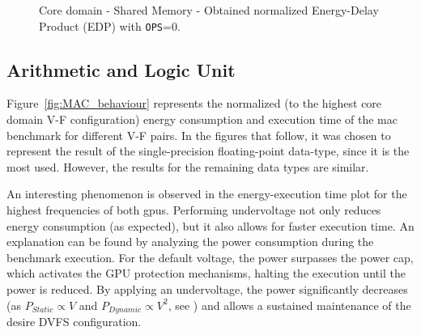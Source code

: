 \begin{figure}[!htb]
    \centering
    \begin{subfigmatrix}{2}
      \label{fig:sm_edp}
    \end{subfigmatrix}
    \caption{Core domain - Shared Memory - Obtained normalized Energy-Delay Product (EDP) with \texttt{OPS}=0.}
\end{figure}



\subsection{Arithmetic and Logic Unit}

\label{sec:MAC_behaviour}
Figure~\ref{fig:MAC_behaviour} represents the normalized (to the highest core domain V-F configuration) energy consumption and execution time of the \acrshort{mac} benchmark for different V-F pairs. In the figures that follow, it was chosen to represent the result of the single-precision floating-point data-type, since it is the most used. However, the results for the remaining data types are similar.

An interesting phenomenon is observed in the energy-execution time plot for the highest frequencies of both \acrshort{gpu}s. Performing undervoltage not only reduces energy consumption (as expected), but it also allows for faster execution time. An explanation can be found by analyzing the power consumption during the benchmark execution. For the default voltage, the power surpasses the power cap, which activates the GPU protection mechanisms, halting the execution until the power is reduced. By applying an undervoltage, the power significantly decreases (as $P_{Static}\propto V$ and $P_{Dynamic}\propto V^2$, see \cite{guerreiro_gpgpu_2018}) and allows a sustained maintenance of the desire DVFS configuration. 

